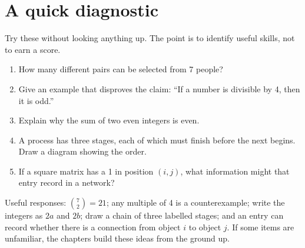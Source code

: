 \chapter*{A quick diagnostic}
Try these without looking anything up. The point is to identify useful skills, not to earn a score.
\begin{enumerate}
\item How many different pairs can be selected from 7 people?
\item Give an example that disproves the claim: ``If a number is divisible by 4, then it is odd.''
\item Explain why the sum of two even integers is even.
\item A process has three stages, each of which must finish before the next begins. Draw a diagram showing the order.
\item If a square matrix has a 1 in position $(i,j)$, what information might that entry record in a network?
\end{enumerate}
Useful responses: $\binom72=21$; any multiple of 4 is a counterexample; write the integers as $2a$ and $2b$; draw a chain of three labelled stages; and an entry can record whether there is a connection from object $i$ to object $j$. If some items are unfamiliar, the chapters build these ideas from the ground up.
